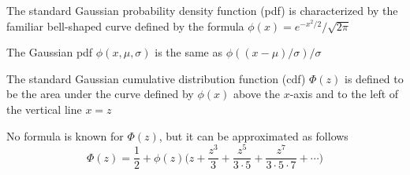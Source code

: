 \documentclass[8pt,a4paper,compress]{beamer}
\begin{document}
\begin{frame}[fragile]
\pause

\begin{minipage}{170pt}
The standard Gaussian probability density function (pdf) is characterized by the familiar bell-shaped curve defined by the formula $\phi(x)=e^{-x^2/2}/\sqrt{2\pi}$

\pause
\bigskip

The Gaussian pdf $\phi(x, \mu, \sigma)$ is the same as $\phi((x-\mu)/\sigma)/\sigma$

\pause
\bigskip

The standard Gaussian cumulative distribution function (cdf) $\Phi(z)$ is defined to be the area under the curve defined by $\phi(x)$ above the $x$-axis and to the left of the vertical line $x=z$ 

\pause
\bigskip

No formula is known for $\Phi(z)$, but it can be approximated as follows $$\Phi(z)=\frac{1}{2}+\phi(z)\big(z+\frac{z^3}{3}+\frac{z^5}{3\cdot 5}+\frac{z^7}{3\cdot 5\cdot 7}+\cdots\big )$$
\end{minipage}\hfill%
\begin{minipage}{130pt}
\begin{center}
\end{center}
\end{minipage}
\end{frame}
\end{document}
